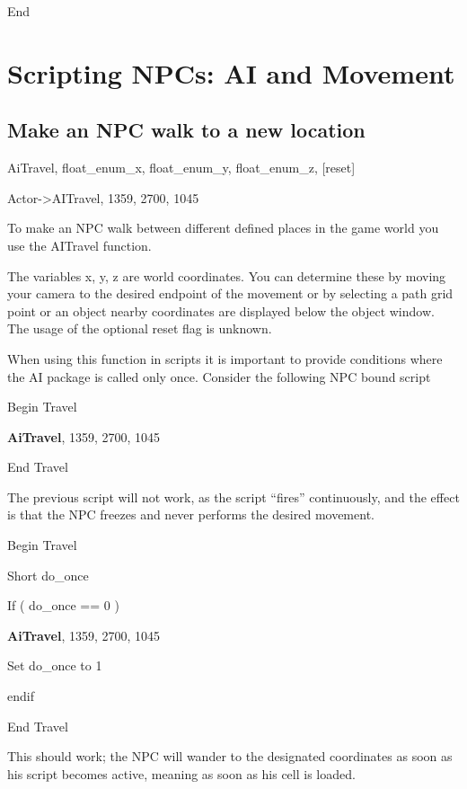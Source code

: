 \documentclass[
]{article}
\begin{document}
End

\hypertarget{scripting-npcs-ai-and-movement}{%
\section{\texorpdfstring{\hfill\break
Scripting NPCs: AI and
Movement}{ Scripting NPCs: AI and Movement}}\label{scripting-npcs-ai-and-movement}}

\hypertarget{make-an-npc-walk-to-a-new-location}{%
\subsection{Make an NPC walk to a new
location}\label{make-an-npc-walk-to-a-new-location}}

AiTravel, float\_enum\_x, float\_enum\_y, float\_enum\_z, {[}reset{]}

Actor-\textgreater AITravel, 1359, 2700, 1045

To make an NPC walk between different defined places in the game world
you use the AITravel function.

The variables x, y, z are world coordinates. You can determine these by
moving your camera to the desired endpoint of the movement or by
selecting a path grid point or an object nearby coordinates are
displayed below the object window. The usage of the optional reset flag
is unknown.

When using this function in scripts it is important to provide
conditions where the AI package is called only once. Consider the
following NPC bound script

Begin Travel

\textbf{AiTravel}, 1359, 2700, 1045

End Travel

The previous script will not work, as the script ``fires'' continuously,
and the effect is that the NPC freezes and never performs the desired
movement.

Begin Travel

Short do\_once

If ( do\_once == 0 )

\textbf{AiTravel}, 1359, 2700, 1045

Set do\_once to 1

endif

End Travel

This should work; the NPC will wander to the designated coordinates as
soon as his script becomes active, meaning as soon as his cell is
loaded.
\end{document}
